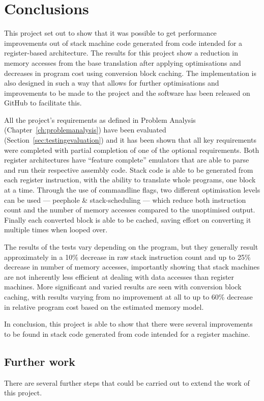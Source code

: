 \chapter{Conclusions}\label{ch:conclusions}

This project set out to show that it was possible to get performance
improvements out of stack machine code generated from code intended for a
register-based architecture. The results for this project show a reduction in
memory accesses from the base translation after applying optimisations and
decreases in program cost using conversion block caching. The implementation is
also designed in such a way that allows for further optimisations and
improvements to be made to the project and the software has been released on
GitHub to facilitate this.

All the project's requirements as defined in Problem Analysis
(Chapter~\ref{ch:problemanalysis}) have been evaluated
(Section~\ref{sec:testingevaluation}) and it has been shown that all key
requirements were completed with partial completion of one of the optional
requirements. Both register architectures have ``feature complete'' emulators
that are able to parse and run their respective assembly code. Stack code is
able to be generated from each register instruction, with the ability to
translate whole programs, one block at a time. Through the use of commandline
flags, two different optimisation levels can be used --- peephole \&
stack-scheduling --- which reduce both instruction count and the number of
memory accesses compared to the unoptimised output.  Finally each converted
block is able to be cached, saving effort on converting it multiple times when
looped over.

The results of the tests vary depending on the program, but they generally
result approximately in a 10\% decrease in raw stack instruction count and up to
25\% decrease in number of memory accesses, importantly showing that stack
machines are not inherently less efficient at dealing with data accesses than
register machines. More significant and varied results are seen with conversion
block caching, with results varying from no improvement at all to up to 60\%
decrease in relative program cost based on the estimated memory model.

In conclusion, this project is able to show that there were several
improvements to be found in stack code generated from code intended for a
register machine.

\section{Further work}\label{sec:furtherwork}
There are several further steps that could be carried out to extend the work of
this project.

